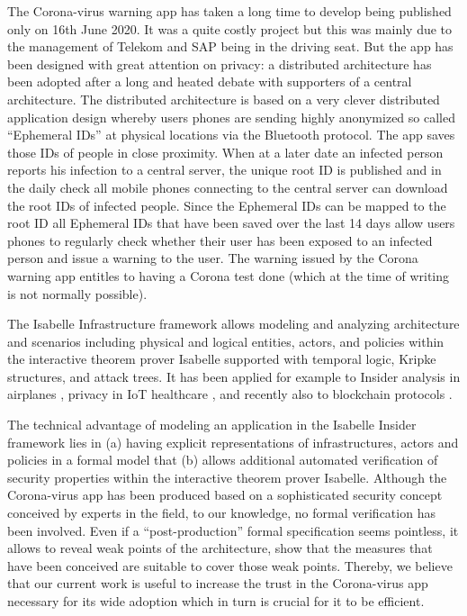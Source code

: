 \documentclass{llncs}
\begin{document}
The Corona-virus warning app has taken a long time to develop being published only on
16th June 2020. It was a quite costly project but this was mainly due to the management of
Telekom and SAP being in the driving seat. But the app has been designed with great
attention on privacy:  a distributed architecture \cite{} has been adopted after a long and
heated debate with supporters of a central architecture. The distributed architecture is
based on a very clever distributed application design whereby users phones are sending
highly anonymized so called ``Ephemeral IDs'' at physical locations via the Bluetooth
protocol. The app saves those IDs of people in close proximity. When at a later date an
infected person reports his infection to a central server, the unique root ID is published
and in the daily check all mobile phones connecting to the central server can download
the root IDs of infected people. Since the Ephemeral IDs can be mapped to the root ID
all Ephemeral IDs that have been saved over the last 14 days allow users phones to
regularly check whether their user has been exposed to an infected person and issue
a warning to the user. The warning issued by the Corona warning app entitles to
having a Corona test done (which at the time of writing is not normally possible).

The Isabelle Infrastructure framework \cite{kam:20a} allows modeling and analyzing
architecture and scenarios including physical and logical entities, actors, and policies
within the interactive theorem prover Isabelle supported with temporal logic, Kripke
structures, and attack trees. It has been applied for example to Insider analysis in
airplanes \cite{kam:20b}, privacy in IoT healthcare \cite{kam:18b}, and recently also
to blockchain protocols \cite{kn:20}.

The technical advantage of modeling an application in the Isabelle Insider framework lies
in (a) having explicit representations of infrastructures, actors and policies in a
formal model that (b) allows additional automated verification of security properties
within the interactive theorem prover Isabelle.
Although the Corona-virus app has been produced based on a sophisticated security
concept conceived by experts in the field, to our knowledge, no formal verification
has been involved. Even if a ``post-production'' formal specification seems pointless,
it allows to reveal weak points of the architecture, show that the measures that have
been conceived are suitable to cover those weak points. Thereby, we believe
that our current work is useful to increase the trust in the Corona-virus app necessary for
its wide adoption which in turn is crucial for it to be efficient.
\end{document}
